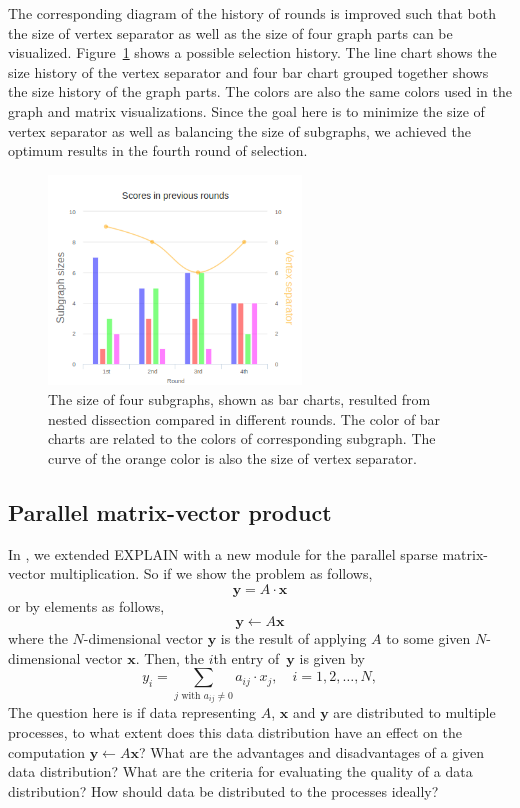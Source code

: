 \documentclass[12pt, twoside,a4paper,toc=bibliography]{scrbook}
\newcommand{\mat}[1]{\ensuremath{#1}}
\newcommand{\vek}[1]{{\ensuremath{\mathbf #1}}}
\begin{document}
The corresponding diagram of the history of rounds is improved such that
both the size of vertex separator as well as the size of four graph parts
can be visualized. Figure~\ref{barchart} shows a possible selection history.
The line chart shows the size history of the vertex separator
and four bar chart grouped together shows the size history of the graph parts.
The colors are also the same colors used in the graph and matrix visualizations.
Since the goal here is to minimize the size of vertex separator as well as balancing the
size of subgraphs, we achieved the optimum results in the fourth round of selection.
\begin{figure}
\centering
\includegraphics[width=0.6\textwidth]{chart2}
\caption{The size of four subgraphs, shown as bar charts,
resulted from nested dissection compared in different rounds.
The color of bar charts are related to the colors of corresponding subgraph.
The curve of the orange color is also the size of vertex separator.}
\label{barchart}
\end{figure}

\subsection{Parallel matrix-vector product}

In \cite{2015:3}, we extended EXPLAIN with a new module for
the parallel sparse matrix-vector multiplication.
So if we show the problem as follows,
$$
\vek{y} = \mat{A}\cdot \vek{x}
$$
or by elements as follows,
\begin{equation}
\label{e.yax}
\vek{y} \leftarrow \mat{A} \vek{x}
\end{equation}
where the $N$-dimensional vector $\vek{y}$ is the result of applying \mat{A} to some
given $N$-dimensional vector $\vek{x}$. Then, the $i$th entry of~$\vek{y}$ is given by
\begin{equation}
\label{e.mvp}
y_i = \sum_{j \text{ with } a_{ij} \neq 0} a_{ij} \cdot x_j ,
\quad
i = 1, 2, \dots, N,
\end{equation}
The question here is if data representing \mat{A}, \vek{x} and
\vek{y} are distributed to multiple processes, to what extent does this data distribution
have an effect on the computation $\vek{y} \leftarrow \mat{A} \vek{x}$? What are the
advantages and disadvantages of a given data distribution? What are the criteria for
evaluating the quality of a data distribution? How should data be distributed to the
processes ideally?
\end{document}
